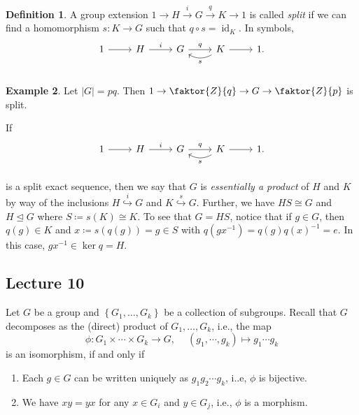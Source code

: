 \documentclass[10pt,letterpaper,cm]{nupset}
\theoremstyle{definition}
\newtheorem{definition}{Definition}[subsection]
\newtheorem{exmp}[definition]{Example}
\theoremstyle{theorem}
\theoremstyle{remark}
\newcommand{\1}{\mathbf{1}}
\newcommand{\0}{\vec 0}
\DeclareMathOperator{\id}{\mathrm{id}}
\begin{document}
\begin{definition}
A group extension $1 \to H  \overset{i}{\longrightarrow} G \overset{q}{\longrightarrow} K \to 1$ is called \textit{split} if we can find a homomorphism $s : K \to G$ such that $q \circ s = \id_K$. In symbols, \[
	\begin{tikzcd}
	1\rar & H\rar["i" above] & G\rar["q" above] & K\rar\lar[bend left=30,"s" below] & 1. \\
	\end{tikzcd}
\]
\end{definition}

\begin{exmp}
Let $\left\lvert{G}\right\rvert= pq$. Then $1 \to \faktor{Z}{q} \to G \to \faktor{Z}{p}$ is split.
\end{exmp}

\medskip

If  \[
	\begin{tikzcd}
	1\rar & H\rar["i" above] & G\rar["q" above] & K\rar\lar[bend left=30,"s" below] & 1. \\
	\end{tikzcd}
\]
is a split exact sequence, then we say that $G$ is \textit{essentially a product} of $H$ and $K$ by way of the inclusions $H \overset{i}{\hookrightarrow} G$ and $K \overset{s}{\hookrightarrow} G$. Further, we have $HS \cong G$ and $H \unlhd G$ where $S\coloneqq s(K) \cong K$. To see that $G = HS$, notice that if $g \in G$, then $q(g) \in K$ and $x\coloneqq  s(q(g)) = g \in S$ with $q(gx^{-1}) = q(g)q(x)^{-1} = e$. In this case, $gx^{-1} \in \ker{q} = H$.


\subsection{Lecture 10}


Let $G$ be a group and $\left\{G_1, \ldots, G_k\right\}$ be a collection of subgroups. Recall that $G$ decomposes as the (direct) product of $G_1, \ldots, G_k$, i.e., the map $$\phi : G_1 \times \cdots \times G_k \to G,\ \quad  \left(g_1, \cdots, g_k\right) \mapsto g_1\cdots g_k$$ is an isomorphism, if and only if
\begin{enumerate}[label=(\roman*)]
\item Each $g\in G$ can be written uniquely as $g_1 g_2\cdots g_k$, i..e, $\phi$ is bijective.
\item We have $xy = yx$ for any $x \in G_i$ and $y\in G_j$, i.e., $\phi$ is a morphism.
\end{enumerate}
\end{document}

